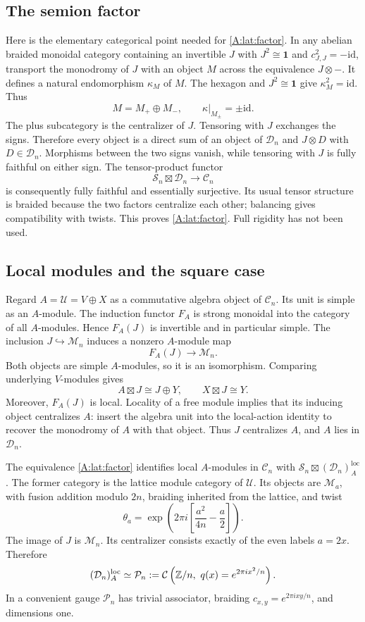 \documentclass[11pt]{article}
\newcommand{\one}{\mathbf1}\newcommand{\D}{\mathcal D}\newcommand{\Dcat}{\mathcal D}
\newcommand{\Scat}{\mathcal S}\newcommand{\U}{\mathcal U}\newcommand{\bo}{\boxtimes}
\numberwithin{equation}{section}
\begin{document}
\subsection{The semion factor}
Here is the elementary categorical point needed for \eqref{A:lat:factor}. In any abelian braided monoidal category containing an invertible $J$ with $J^2\cong\one$ and $c_{J,J}^2=-\mathrm{id}$, transport the monodromy of $J$ with an object $M$ across the equivalence $J\otimes-$. It defines a natural endomorphism $\kappa_M$ of $M$. The hexagon and $J^2\cong\one$ give $\kappa_M^2=\mathrm{id}$. Thus
\[
 M=M_+\oplus M_-,\qquad \kappa|_{M_\pm}=\pm\mathrm{id}.
\]
The plus subcategory is the centralizer of $J$. Tensoring with $J$ exchanges the signs. Therefore every object is a direct sum of an object of $\Dcat_n$ and $J\otimes D$ with $D\in\Dcat_n$. Morphisms between the two signs vanish, while tensoring with $J$ is fully faithful on either sign. The tensor-product functor
\[
 \Scat_n\boxtimes\Dcat_n\longrightarrow\mathcal C_n
\]
is consequently fully faithful and essentially surjective. Its usual tensor structure is braided because the two factors centralize each other; balancing gives compatibility with twists. This proves \eqref{A:lat:factor}. Full rigidity has not been used.

\subsection{Local modules and the square case}\label{A:lat:condensation}
Regard $A=\U=V\oplus X$ as a commutative algebra object of $\mathcal C_n$. Its unit is simple as an $A$-module. The induction functor $F_A$ is strong monoidal into the category of all $A$-modules. Hence $F_A(J)$ is invertible and in particular simple. The inclusion $J\hookrightarrow \mathcal M_n$ induces a nonzero $A$-module map
\[
 F_A(J)\longrightarrow \mathcal M_n.
\]
Both objects are simple $A$-modules, so it is an isomorphism. Comparing underlying $V$-modules gives
\[
 A\boxtimes J\cong J\oplus Y,\qquad X\boxtimes J\cong Y.
\]
Moreover, $F_A(J)$ is local. Locality of a free module implies that its inducing object centralizes $A$: insert the algebra unit into the local-action identity to recover the monodromy of $A$ with that object. Thus $J$ centralizes $A$, and $A$ lies in $\Dcat_n$.

The equivalence \eqref{A:lat:factor} identifies local $A$-modules in $\mathcal C_n$ with $\Scat_n\boxtimes(\Dcat_n)_A^{\mathrm{loc}}$. The former category is the lattice module category of $\U$. Its objects are $\mathcal M_a$, with fusion addition modulo $2n$, braiding inherited from the lattice, and twist
\[
 \theta_a=\exp\left(2\pi i\left[\frac{a^2}{4n}-\frac a2\right]\right).
\]
The image of $J$ is $\mathcal M_n$. Its centralizer consists exactly of the even labels $a=2x$. Therefore
\begin{equation}\label{A:lat:pointed}
 (\Dcat_n)_A^{\mathrm{loc}}\simeq\mathcal P_n
 :=\mathcal C\left(\Z/n,\ q(x)=e^{2\pi i x^2/n}\right).
\end{equation}
In a convenient gauge $\mathcal P_n$ has trivial associator, braiding $c_{x,y}=e^{2\pi ixy/n}$, and dimensions one.
\end{document}
